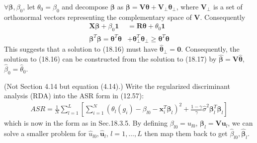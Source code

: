 \begin{exercise}
  $\forall\bm{\beta}, \beta_0$, let $\theta_0 = \beta_0$ and decompose
  $\bm{\beta}$ as $\bm{\beta} = \mathbf{V}\bm{\theta} +
  \mathbf{V}_{\perp}\bm{\theta}_{\perp}$, where $\mathbf{V}_{\perp}$
  is a set of orthonormal vectors representing the complementary space of 
  $\mathbf{V}$.
  Consequently
  \begin{subequations}
    \begin{align}
      \mathbf{X}\bm{\beta} + \beta_0\mathbf{1} & = \mathbf{R}\bm{\theta} +
      \theta_0\mathbf{1} \\
      \bm{\beta}^T\bm{\beta} = \bm{\theta}^T\bm{\theta} & +
      \bm{\theta}_{\perp}^T\bm{\theta}_{\perp} \geq \bm{\theta}^T\bm{\theta}
    \end{align}
  \end{subequations}
  This suggests that a solution to (18.16) must have $\hat{\bm{\theta}}_{\perp}
  = \mathbf{0}$. Consequently, the solution to (18.16) can be constructed from
  the solution to (18.17) by $\hat{\bm{\beta}} = \mathbf{V}\hat{\bm{\theta}}$,
  $\hat{\beta}_0 = \hat{\theta}_0$.
\end{exercise}

\begin{exercise}
  (Not Section 4.14 but equation (4.14).) Write the regularized discriminant
  analysis (RDA) into the ASR form in (12.57):
  \begin{align}
    ASR = \frac{1}{N}\sum_{l=1}^L \left[\sum_{i=1}^N \left(\theta_l(g_i) -
    \beta_{l0} - \mathbf{x}_i^T\mathbf{\bm{\beta}}_l \right)^2 +
    \frac{1-\gamma}{\gamma} \hat{\sigma}^2\bm{\beta}_l^T\bm{\beta}_l \right]
  \end{align}
  which is now in the form as in Sec.18.3.5. By defining $\beta_{l0} = u_{l0}$,
  $\bm{\beta}_l = \mathbf{V}\mathbf{u}_l$, we can solve a smaller problem for
  $\hat{u}_{l0}, \hat{\mathbf{u}}_l$, $l=1,\ldots,L$ then map them back to get
  $\hat{\beta}_{l0}, \hat{\bm{\beta}}_l$.
\end{exercise}

